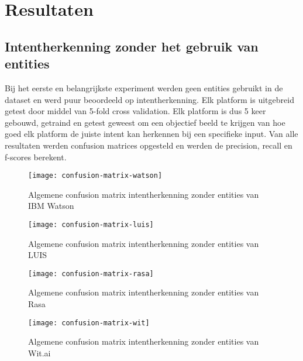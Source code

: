 
\chapter{Resultaten}
\label{ch:resultaten}

\section{Intentherkenning zonder het gebruik van entities}
\label{intent}

Bij het eerste en belangrijkste experiment werden geen entities gebruikt in de dataset en werd puur beoordeeld op intentherkenning. Elk platform is uitgebreid getest door middel van 5-fold cross validation. Elk platform is dus 5 keer gebouwd, getraind en getest geweest om een objectief beeld te krijgen van hoe goed elk platform de juiste intent kan herkennen bij een specifieke input. Van alle resultaten werden confusion matrices opgesteld en werden de precision, recall en f-scores berekent.

\begin{figure}[H]
    \label{fig:confusion-matrix-watson}
    \centering
    \texttt{[image: confusion-matrix-watson]}
    \caption{Algemene confusion matrix intentherkenning zonder entities van IBM Watson}
\end{figure}

\begin{figure}[H]
    \label{fig:confusion-matrix-luis}
    \centering
    \texttt{[image: confusion-matrix-luis]}
    \caption{Algemene confusion matrix intentherkenning zonder entities van LUIS}
\end{figure}

\begin{figure}[H]
    \label{fig:confusion-matrix-rasa}
    \centering
    \texttt{[image: confusion-matrix-rasa]}
    \caption{Algemene confusion matrix intentherkenning zonder entities van Rasa}
\end{figure}

\begin{figure}[H]
    \label{fig:confusion-matrix-wit}
    \centering
    \texttt{[image: confusion-matrix-wit]}
    \caption{Algemene confusion matrix intentherkenning zonder entities van Wit.ai}
\end{figure}


